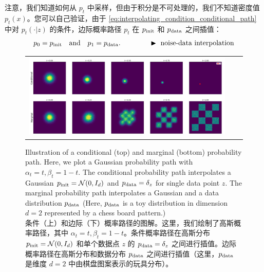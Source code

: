 注意，我们知道如何从 $p_t$ 中采样，但由于积分是不可处理的，我们不知道密度值 $p_t(x)$。您可以自己验证，由于 \cref{eq:interpolating_condition_conditional_path} 中对 $p_t(\cdot|z)$ 的条件，边际概率路径 $p_t$ 在 $p_{\rm{init}}$ 和 $p_{\rm{data}}$ 之间插值：
\begin{align}
\label{eq:noise_interpolation}
p_0 =p_{\rm{init}}\quad\text{and}\quad p_1=p_{\rm{data}}.\quad\quad\quad\quad \blacktriangleright\,\,\text{noise-data interpolation}
\end{align}
\begin{figure}[!t]
    \centering
    \begin{tabular}{ccc}
\includegraphics[width=\textwidth]{figures/conditional_vs_marginal.png} &
    \end{tabular}
\caption{\label{fig:cond_marginal_path_histograms}Illustration of a conditional (top) and marginal (bottom) probability path. Here, we plot a Gaussian probability path with $\alpha_t=t,\beta_t=1-t$. The conditional probability path interpolates a Gaussian $p_{\rm{init}}=\mathcal{N}(0,I_d)$ and $p_{\rm{data}}=\delta_{z}$ for single data point $z$. The marginal probability path interpolates a Gaussian and a data distribution $p_{\rm{data}}$ (Here, $p_{\rm{data}}$ is a toy distribution in dimension $d=2$ represented by a chess board pattern.)\\条件（上）和边际（下）概率路径的图解。这里，我们绘制了高斯概率路径，其中 $\alpha_t=t,\beta_t=1-t$。条件概率路径在高斯分布 $p_{\rm{init}}=\mathcal{N}(0,I_d)$ 和单个数据点 $z$ 的 $p_{\rm{data}}=\delta_{z}$ 之间进行插值。边际概率路径在高斯分布和数据分布 $p_{\rm{data}}$ 之间进行插值（这里，$p_{\rm{data}}$ 是维度 $d=2$ 中由棋盘图案表示的玩具分布）。}
\end{figure}
